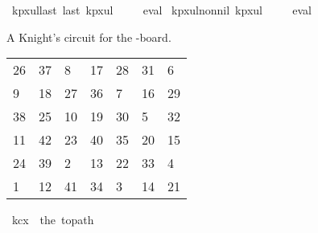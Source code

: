 \begin{isabellebody}
%
\isadelimproof
%
\endisadelimproof
\isanewline
\isanewline
{}\isamarkupfalse%
\ kp{\isacharunderscore}{\kern0pt}{}x{}{\isacharunderscore}{\kern0pt}ul{\isacharunderscore}{\kern0pt}last{\isacharcolon}{\kern0pt}\ {\isachardoublequoteopen}last\ kp{}x{}ul\ {\isacharequal}{\kern0pt}\ {\isacharparenleft}{\kern0pt}{}{\isacharcomma}{\kern0pt}{}{\isacharparenright}{\kern0pt}{\isachardoublequoteclose}%
\isadelimproof
\ %
\endisadelimproof
%
\isatagproof
{}\isamarkupfalse%
\ eval%
\endisatagproof
{\isafoldproof}%
%
\isadelimproof
%
\endisadelimproof
\isanewline
\isanewline
{}\isamarkupfalse%
\ kp{\isacharunderscore}{\kern0pt}{}x{}{\isacharunderscore}{\kern0pt}ul{\isacharunderscore}{\kern0pt}non{\isacharunderscore}{\kern0pt}nil{\isacharcolon}{\kern0pt}\ {\isachardoublequoteopen}kp{}x{}ul\ {\isasymnoteq}\ {\isacharbrackleft}{\kern0pt}{\isacharbrackright}{\kern0pt}{\isachardoublequoteclose}%
\isadelimproof
\ %
\endisadelimproof
%
\isatagproof
{}\isamarkupfalse%
\ eval%
\endisatagproof
{\isafoldproof}%
%
\isadelimproof
%
\endisadelimproof
%
\begin{isamarkuptext}%
A Knight's circuit for the -board.
  \begin{table}[H]
    \begin{tabular}{lllllll}
      26 & 37 &  8 & 17 & 28 & 31 &  6 \\
       9 & 18 & 27 & 36 &  7 & 16 & 29 \\
      38 & 25 & 10 & 19 & 30 &  5 & 32 \\
      11 & 42 & 23 & 40 & 35 & 20 & 15 \\
      24 & 39 &  2 & 13 & 22 & 33 &  4 \\
       1 & 12 & 41 & 34 &  3 & 14 & 21
    \end{tabular}
  \end{table}%
\end{isamarkuptext}\isamarkuptrue%
\isamarkupfalse%
\ {\isachardoublequoteopen}kc{}x{}\ {\isasymequiv}\ the\ {\isacharparenleft}{\kern0pt}to{\isacharunderscore}{\kern0pt}path\ \isanewline
\ \ {\isacharbrackleft}{\kern0pt}{\isacharbrackleft}{\kern0pt}{}{}{\isacharcomma}{\kern0pt}{}{}{\isacharcomma}{\kern0pt}{}{\isacharcomma}{\kern0pt}{}{}{\isacharcomma}{\kern0pt}{}{}{\isacharcomma}{\kern0pt}{}{}{\isacharcomma}{\kern0pt}{}{\isacharbrackright}{\kern0pt}{\isacharcomma}{\kern0pt}\isanewline

\end{isabellebody}
